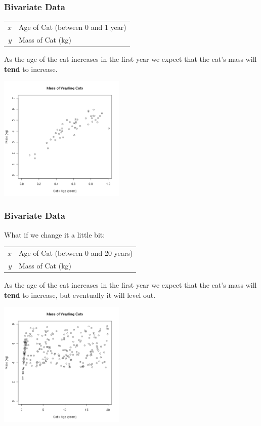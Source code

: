 \begin{frame}
  \frametitle{Bivariate Data}

  \begin{tabular}{r@{~$=$~}l}
    $x$ & Age of Cat (between 0 and 1 year)  \\
    $y$ & Mass of Cat (kg)
  \end{tabular}
  
  \vfill

  {

    As the age of the cat increases in the first year we expect that
    the cat's mass will \textbf{tend} to increase.

  }

  {
    \includegraphics[width=6cm]{img/catsmass}
  }

  \vfill


\end{frame}


\begin{frame}
  \frametitle{Bivariate Data}

  \vspace*{-1em}
  What if we change it a little bit: \\
  \begin{tabular}{r@{~$=$~}l}
    $x$ & Age of Cat (between 0 and 20 years)  \\
    $y$ & Mass of Cat (kg)
  \end{tabular}
  
  \vfill

  {

    As the age of the cat increases in the first year we expect that
    the cat's mass will \textbf{tend} to increase, but eventually it
    will level out.

  }

  {
    \vspace*{-1em}
    \includegraphics[width=6cm]{img/catsmassLater}
  }

  \vfill


\end{frame}


